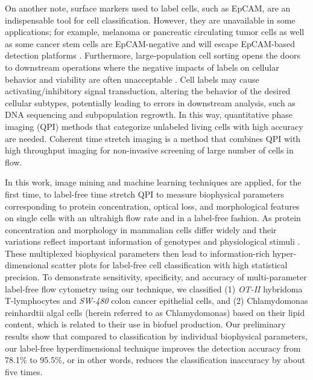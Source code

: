 \documentclass[aps,pra,reprint,superscriptaddress]{revtex4-1}
\begin{document}
\begin{figure}
\end{figure}

On another note, surface markers used to label cells, such as EpCAM, are an indispensable tool for cell classification. However, they are unavailable in some applications; for example, melanoma or pancreatic circulating tumor cells as well as some cancer stem cells are EpCAM-negative and will escape EpCAM-based detection platforms \cite{kling2012beyond}. Furthermore, large-population cell sorting opens the doors to downstream operations where the negative impacts of labels on cellular behavior and viability are often unacceptable \cite{boddington2011labeling}. Cell labels may cause activating/inhibitory signal transduction, altering the behavior of the desired cellular subtypes, potentially leading to errors in downstream analysis, such as DNA sequencing and subpopulation regrowth. In this way, quantitative phase imaging (QPI) methods \cite{ikeda2005hilbert,popescu2011quantitative,pham2013real} that categorize unlabeled living cells with high accuracy are needed. Coherent time stretch imaging is a method that combines QPI with high throughput imaging for non-invasive screening of large number of cells in flow.

In this work, image mining and machine learning techniques are applied, for the first time, to label-free time stretch QPI to measure biophysical parameters corresponding to protein concentration, optical loss, and morphological features on single cells with an ultrahigh flow rate and in a label-free fashion. As protein concentration and morphology in mammalian cells differ widely \cite{feinerman2008variability, sigal2006variability, friebel1999optical, vona2000isolation} and their variations reflect important information of genotypes and physiological stimuli \cite{spencer2009non}. These multiplexed biophysical parameters then lead to information-rich hyper-dimensional scatter plots for label-free cell classification with high statistical precision. To demonstrate sensitivity, specificity, and accuracy of multi-parameter label-free flow cytometry using our technique, we classified (1) \textit{OT-II} hybridoma T-lymphocytes and \textit{SW-480} colon cancer epithelial cells, and (2) Chlamydomonas reinhardtii algal cells (herein referred to as Chlamydomonas) based on their lipid content, which is related to their use in biofuel production. Our preliminary results show that compared to classification by individual biophysical parameters, our label-free hyperdimensional technique improves the detection accuracy from 78.1\% to 95.5\%, or in other words, reduces the classification inaccuracy by about five times. 
\end{document}
